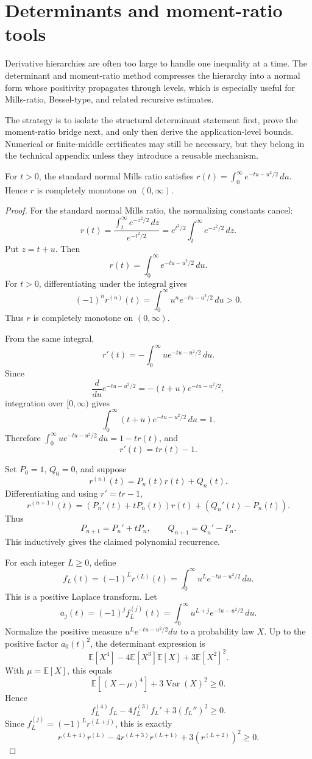 \section{Determinants and moment-ratio tools}
Derivative hierarchies are often too large to handle one inequality at a time.  The determinant and moment-ratio method compresses the hierarchy into a normal form whose positivity propagates through levels, which is especially useful for Mills-ratio, Bessel-type, and related recursive estimates.

The strategy is to isolate the structural determinant statement first, prove the moment-ratio bridge next, and only then derive the application-level bounds.  Numerical or finite-middle certificates may still be necessary, but they belong in the technical appendix unless they introduce a reusable mechanism.
\begin{theorem}
\label{res:from-mills-laplace-cm-normal-form}
For \(t>0\), the standard normal Mills ratio satisfies \(r(t)=\int_0^\infty e^{-tu-u^2/2}\,du\). Hence \(r\) is completely monotone on \((0,\infty)\).
\end{theorem}
\begin{proof}
For the standard normal Mills ratio, the normalizing constants cancel:
\[
r(t)=\frac{\int_t^\infty e^{-z^2/2}\,dz}{e^{-t^2/2}}
=e^{t^2/2}\int_t^\infty e^{-z^2/2}\,dz.
\]
Put \(z=t+u\). Then
\[
r(t)=\int_0^\infty e^{-tu-u^2/2}\,du.
\]
For \(t>0\), differentiating under the integral gives
\[
(-1)^n r^{(n)}(t)=\int_0^\infty u^n e^{-tu-u^2/2}\,du>0.
\]
Thus \(r\) is completely monotone on \((0,\infty)\).

From the same integral,
\[
r'(t)=-\int_0^\infty u e^{-tu-u^2/2}\,du.
\]
Since
\[
\frac{d}{du}e^{-tu-u^2/2}=-(t+u)e^{-tu-u^2/2},
\]
integration over \([0,\infty)\) gives
\[
\int_0^\infty (t+u)e^{-tu-u^2/2}\,du=1.
\]
Therefore \(\int_0^\infty u e^{-tu-u^2/2}\,du=1-tr(t)\), and
\[
r'(t)=tr(t)-1.
\]

Set \(P_0=1\), \(Q_0=0\), and suppose
\[
r^{(n)}(t)=P_n(t)r(t)+Q_n(t).
\]
Differentiating and using \(r'=tr-1\),
\[
r^{(n+1)}(t)=(P_n'(t)+tP_n(t))r(t)+(Q_n'(t)-P_n(t)).
\]
Thus
\[
P_{n+1}=P_n'+tP_n,\qquad Q_{n+1}=Q_n'-P_n.
\]
This inductively gives the claimed polynomial recurrence.

For each integer \(L\ge0\), define
\[
f_L(t)=(-1)^L r^{(L)}(t)=\int_0^\infty u^L e^{-tu-u^2/2}\,du.
\]
This is a positive Laplace transform. Let
\[
a_j(t)=(-1)^j f_L^{(j)}(t)=\int_0^\infty u^{L+j}e^{-tu-u^2/2}\,du.
\]
Normalize the positive measure \(u^L e^{-tu-u^2/2}du\) to a probability law \(X\). Up to the positive factor \(a_0(t)^2\), the determinant expression is
\[
\mathbb E[X^4]-4\mathbb E[X^3]\mathbb E[X]+3\mathbb E[X^2]^2.
\]
With \(\mu=\mathbb E[X]\), this equals
\[
\mathbb E[(X-\mu)^4]+3\operatorname{Var}(X)^2\ge0.
\]
Hence
\[
f_L^{(4)}f_L-4f_L^{(3)}f_L'+3(f_L'')^2\ge0.
\]
Since \(f_L^{(j)}=(-1)^L r^{(L+j)}\), this is exactly
\[
r^{(L+4)}r^{(L)}-4r^{(L+3)}r^{(L+1)}+3(r^{(L+2)})^2\ge0.
\]
\end{proof}

